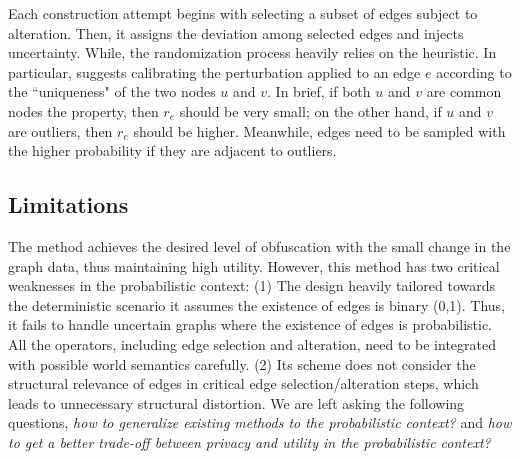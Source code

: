 Each construction attempt begins with selecting a subset of edges subject to alteration. 
Then, it assigns the deviation among selected edges and injects uncertainty. 
While, the randomization process heavily relies on the heuristic.  
In particular, {\soaName} suggests calibrating the perturbation applied to an edge $e$ according to the ``uniqueness" of the two nodes $u$ and $v$. 
In brief, if both $u$ and $v$ are common nodes {\wrt} the property, then $r_{e}$ should be very small; 
on the other hand, if $u$ and $v$ are outliers, then $r_{e}$ should be higher. 
Meanwhile, edges need to be sampled with the higher probability if they are adjacent to outliers. 

\subsection{Limitations} 
The {\soaName} method achieves the desired level of obfuscation with the small change in the graph data, thus maintaining high utility.
However, this method has two critical weaknesses in the probabilistic context:
(1) The design heavily tailored towards the deterministic scenario {\eg} it assumes the existence of edges is binary (0,1). Thus, it fails to handle uncertain graphs where the existence of edges is probabilistic. 
All the operators, including edge selection and alteration, need to be integrated with possible world semantics carefully.
(2)  Its scheme does not consider the structural relevance of edges in critical edge selection/alteration steps, which leads to unnecessary structural distortion.
We are left asking the following questions, \emph{how to generalize existing methods to the probabilistic context?} and \emph{how to get a better trade-off between privacy and utility in the probabilistic context?} 